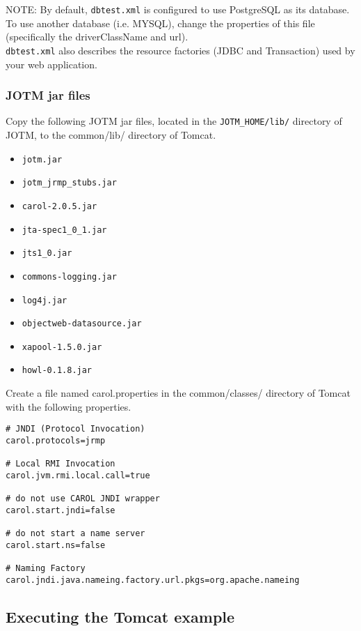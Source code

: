 \documentclass[a4paper,11pt]{article}
\begin{document}
NOTE: By default, \texttt{dbtest.xml} is configured to use PostgreSQL
 as its database. 
To use another database (i.e. MYSQL), change the properties of this file 
(specifically the driverClassName and url).\\

\noindent \texttt{dbtest.xml} also describes the resource factories 
(JDBC and Transaction) used by your web application.

\subsubsection{JOTM jar files}
Copy the following JOTM jar files, located in the \texttt{JOTM\_HOME/lib/}
 directory of JOTM, to the common/lib/ directory of Tomcat.

\begin{itemize}
\item \texttt{jotm.jar}
\item \texttt{jotm\_jrmp\_stubs.jar}
\item \texttt{carol-2.0.5.jar}
\item \texttt{jta-spec1\_0\_1.jar}
\item \texttt{jts1\_0.jar}
\item \texttt{commons-logging.jar}
\item \texttt{log4j.jar}
\item \texttt{objectweb-datasource.jar}
\item \texttt{xapool-1.5.0.jar}
\item \texttt{howl-0.1.8.jar}
\end{itemize}

\noindent Create a file named carol.properties in the common/classes/ 
directory of Tomcat with the following properties.
\begin{verbatim}
# JNDI (Protocol Invocation)
carol.protocols=jrmp

# Local RMI Invocation
carol.jvm.rmi.local.call=true

# do not use CAROL JNDI wrapper
carol.start.jndi=false

# do not start a name server
carol.start.ns=false

# Naming Factory
carol.jndi.java.nameing.factory.url.pkgs=org.apache.nameing
\end{verbatim}

\subsection{Executing the Tomcat example}
\label{sec:tomcat_run}
\end{document}
